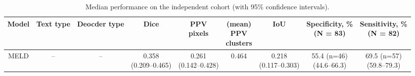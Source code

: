 \documentclass[FCD_GNN.tex]{subfiles}
\begin{document}
\begin{table}[H]
    \tiny
    \renewcommand{\arraystretch}{1.4}
    \begin{threeparttable}
    \centering
    \caption{Median performance on the independent cohort (with 95\% confidence intervals).} 
    \label{tab:independent_cohort_final}
    \begin{tabular}{ccccccccc}
    \textbf{Model} &
    \textbf{Text type} &
    \textbf{Deocder type} &
    \textbf{Dice} &
    \makecell{\textbf{PPV}\\\textbf{pixels}} &
    \makecell{\textbf{(mean)} \\\textbf{PPV}\\\textbf{clusters}} & 
    \textbf{IoU} & 
    \makecell{\textbf{Specificity, \%} \\ (N = 83)}&
    \makecell{\textbf{Sensitivity, \%} \\ (N = 82)}\\
    \midrule
    MELD &
    -- &
    -- &
    \makecell{0.358\\(0.209--0.465)} &
    \makecell{0.261\\(0.142--0.428)} &
    0.464 &
    \makecell{0.218\\(0.117--0.303)} &
    \makecell{55.4 (n=46) \\ (44.6--66.3)} & 
    \makecell{69.5 (n=57) \\ (59.8--79.3)} \\
    
    \hline
    

\end{tabular}
\end{threeparttable}
\end{table}
\end{document}

